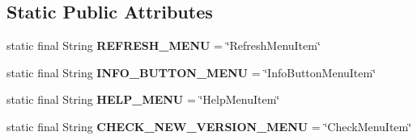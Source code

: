 \subsection*{Static Public Attributes}
\begin{DoxyCompactItemize}
\item 
\hypertarget{classgov_1_1fnal_1_1ppd_1_1dd_1_1util_1_1guiUtils_1_1FileMenu_ab12b8b811ce9e2d85719812aa07ec59d}{static final String {\bfseries R\-E\-F\-R\-E\-S\-H\-\_\-\-M\-E\-N\-U} = \char`\"{}Refresh\-Menu\-Item\char`\"{}}\label{classgov_1_1fnal_1_1ppd_1_1dd_1_1util_1_1guiUtils_1_1FileMenu_ab12b8b811ce9e2d85719812aa07ec59d}

\item 
\hypertarget{classgov_1_1fnal_1_1ppd_1_1dd_1_1util_1_1guiUtils_1_1FileMenu_a169bad178ab8ae9f493d1871a82e1a01}{static final String {\bfseries I\-N\-F\-O\-\_\-\-B\-U\-T\-T\-O\-N\-\_\-\-M\-E\-N\-U} = \char`\"{}Info\-Button\-Menu\-Item\char`\"{}}\label{classgov_1_1fnal_1_1ppd_1_1dd_1_1util_1_1guiUtils_1_1FileMenu_a169bad178ab8ae9f493d1871a82e1a01}

\item 
\hypertarget{classgov_1_1fnal_1_1ppd_1_1dd_1_1util_1_1guiUtils_1_1FileMenu_a4de836062c4d4a7ae1a0951225d3306a}{static final String {\bfseries H\-E\-L\-P\-\_\-\-M\-E\-N\-U} = \char`\"{}Help\-Menu\-Item\char`\"{}}\label{classgov_1_1fnal_1_1ppd_1_1dd_1_1util_1_1guiUtils_1_1FileMenu_a4de836062c4d4a7ae1a0951225d3306a}

\item 
\hypertarget{classgov_1_1fnal_1_1ppd_1_1dd_1_1util_1_1guiUtils_1_1FileMenu_a4d41206edf56ebc35d253617c63f9336}{static final String {\bfseries C\-H\-E\-C\-K\-\_\-\-N\-E\-W\-\_\-\-V\-E\-R\-S\-I\-O\-N\-\_\-\-M\-E\-N\-U} = \char`\"{}Check\-Menu\-Item\char`\"{}}\label{classgov_1_1fnal_1_1ppd_1_1dd_1_1util_1_1guiUtils_1_1FileMenu_a4d41206edf56ebc35d253617c63f9336}

\end{DoxyCompactItemize}


